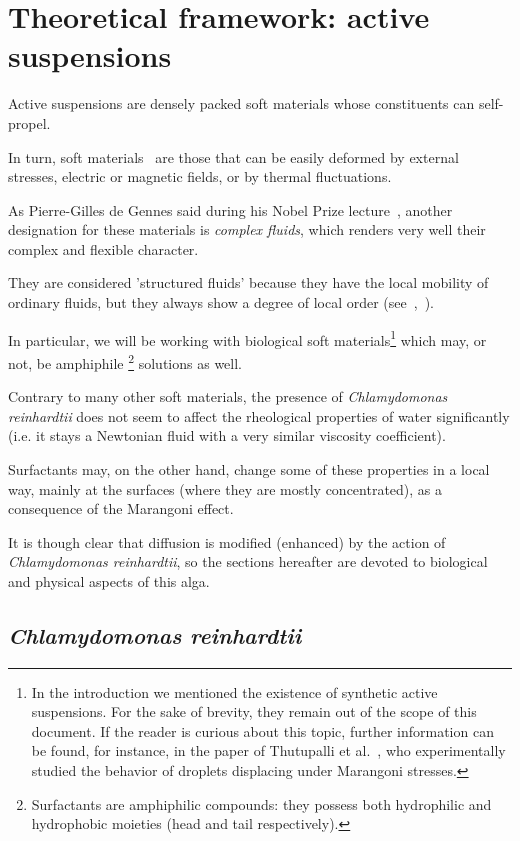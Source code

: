 \chapter{Theoretical framework: active suspensions}
\label{active_suspensions}

Active suspensions are densely packed soft materials whose constituents can self-propel.

In turn, soft materials~\cite{Soft_materials} are those that can be easily deformed by external stresses, electric or magnetic fields, or by thermal fluctuations. 

As Pierre-Gilles de Gennes said during his Nobel Prize lecture~\cite{PGG}, another designation for these materials is \textit{complex fluids}, which renders very well their complex and flexible character.

They are considered 'structured fluids' because they have the local mobility of ordinary fluids, but they always show a degree of local order (see~\cite{soft_matter},~\cite{Hamley}).

In particular, we will be working with biological soft materials\footnote{In the introduction we mentioned the existence of synthetic active suspensions. For the sake of brevity, they remain out of the scope of this document. If the reader is curious about this topic, further information can be found, for instance, in the paper of Thutupalli et al.~\cite{Thutupalli}, who experimentally studied the behavior of droplets displacing under Marangoni stresses.} which may, or not, be amphiphile \footnote{Surfactants are amphiphilic compounds: they possess both hydrophilic and hydrophobic moieties (head and tail respectively).} solutions as well.

Contrary to many other soft materials, the presence of \textit{Chlamydomonas reinhardtii} does not seem to affect the rheological properties of water significantly (i.e. it stays a Newtonian fluid with a very similar viscosity coefficient).

Surfactants may, on the other hand, change some of these properties in a local way, mainly at the surfaces (where they are mostly concentrated), as a consequence of the Marangoni effect.

It is though clear that diffusion is modified (enhanced) by the action of \textit{Chlamydomonas reinhardtii}, so the sections hereafter are devoted to biological and physical aspects of this alga.

\section{\textit{Chlamydomonas reinhardtii}}

